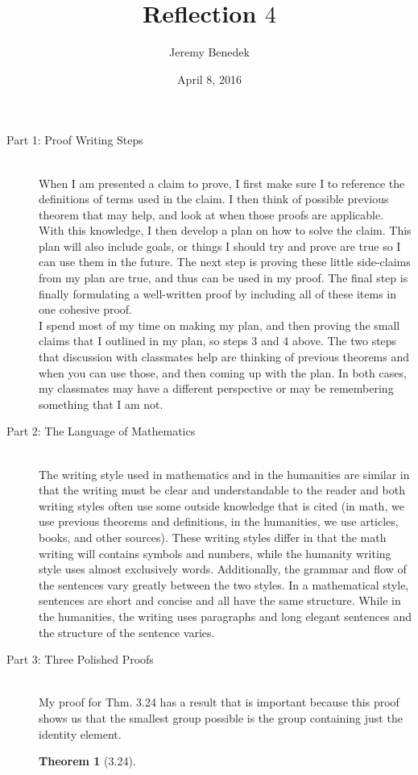 \documentclass{article}
\title{Reflection $4$}
\author{Jeremy Benedek}
\date{April 8, 2016}
\newtheorem*{thm}{Theorem}
\begin{document}
\maketitle

\begin{description}
	\item[Part 1: Proof Writing Steps] \hfill \\
		When I am presented a claim to prove, I first make sure I 
		to reference the definitions of terms used in the claim. I then think of
		possible previous theorem that may help, and look at when those proofs are applicable.  
		With this knowledge, I then develop a plan on how to solve the claim. This plan will also include goals, or things I should
		try and prove are true so I can use them in the future. The next step is proving these little side-claims from my plan are true, and
		thus can be used in my proof. The final step is
		finally formulating a well-written proof by including all of these items in one cohesive proof.
		\\
		I spend most of my time on making my plan, and then proving the small claims that I outlined in my plan, so steps 3 and 4 above. 
		The two steps that discussion with classmates help are thinking of previous theorems and when  you can use those, and then coming
		up with the plan. In both cases, my classmates may have a different perspective or may be remembering something that I am not. 

	\item[Part 2: The Language of Mathematics] \hfil \\
		The writing style used in mathematics and in the humanities are similar in that the writing must be clear and understandable to
		the reader and both writing styles often use some
		outside knowledge that is cited (in math, we use previous theorems and definitions, in the humanities, we use articles, books, and
		other sources). These writing styles differ in that the math writing will contains symbols and numbers, while the humanity writing 
		style uses almost exclusively words. Additionally, the grammar and flow of the sentences vary greatly between the two styles. In a 
		mathematical style, sentences are short and concise and all have the same structure.
		While in the humanities, the writing uses paragraphs and long elegant sentences
		and the structure of the sentence varies. 

	\item[Part 3: Three Polished Proofs] \hfil \\
		My proof for Thm. 3.24 has a result that is important because this proof shows us that the smallest group possible is the group
		containing just the identity element. 
	  \begin{thm}[3.24]
	      

\end{thm}
\end{description}
\end{document}
